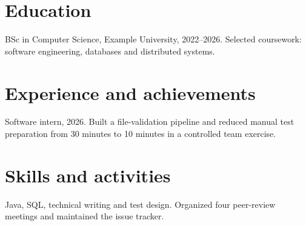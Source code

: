 \section{Education}
BSc in Computer Science, Example University, 2022--2026. Selected coursework: software engineering, databases and distributed systems.

\section{Experience and achievements}
Software intern, 2026. Built a file-validation pipeline and reduced manual test preparation from 30 minutes to 10 minutes in a controlled team exercise.

\section{Skills and activities}
Java, SQL, technical writing and test design. Organized four peer-review meetings and maintained the issue tracker.

